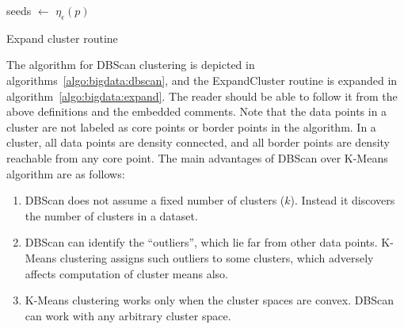 \begin{algorithm}[!htbp]
	\DontPrintSemicolon
 	\SetAlgoLined
	 {
		seeds $\leftarrow$ $\eta_{\epsilon}(p)$\;
	} %
\caption{Expand cluster routine}
\label{algo:bigdata:expand}
\end{algorithm}

\noindent
{} 
The algorithm for DBScan clustering is depicted in algorithms~\ref{algo:bigdata:dbscan}, and the ExpandCluster routine is
expanded in algorithm~\ref{algo:bigdata:expand}. 
The reader should be able to follow it from the above definitions and the embedded comments. Note that the data points in a cluster 
are not labeled as core points or border points in the algorithm. In a cluster, all data points are density connected, and all border 
points are density reachable from any core point. 
%
The main advantages of DBScan over K-Means algorithm are as follows:
\begin{enumerate}
	\item DBScan does not assume a fixed number of clusters ($k$). Instead it discovers the number of clusters in a dataset.
	\item DBScan can identify the ``outliers'', which lie far from other data points. K-Means clustering assigns such outliers
		to some clusters, which adversely affects computation of cluster means also.
	\item K-Means clustering works only when the cluster spaces are convex. DBScan can work with any arbitrary cluster space.
\end{enumerate}

